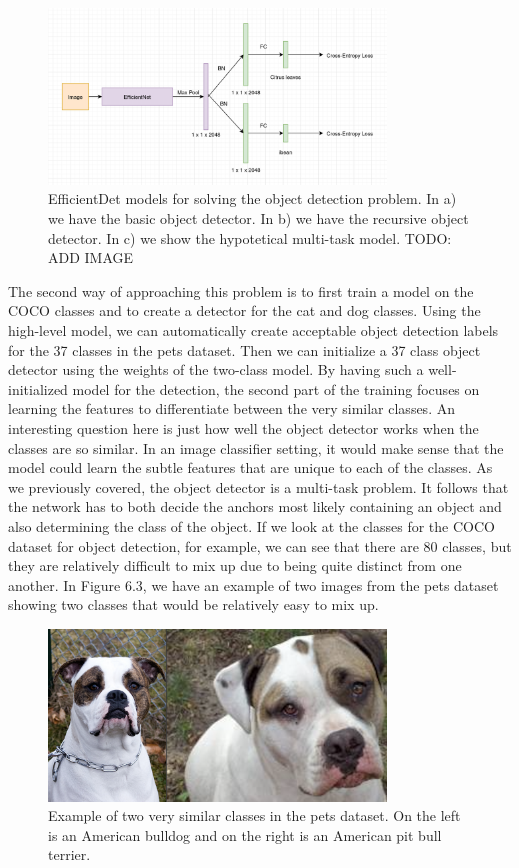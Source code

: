 \begin{figure}[h!] 
\centering 
\includegraphics[width=0.8\textwidth]{imgs/object_classification_architecture.png}
\caption{EfficientDet models for solving the object detection problem. In a) we have the basic object detector. In b) we have the recursive object detector. In c) we show the hypotetical multi-task model. TODO: ADD IMAGE}
\end{figure}

The second way of approaching this problem is to first train a model on the COCO classes and to create a detector for the cat and dog classes.
Using the high-level model, we can automatically create acceptable object detection labels for the 37 classes in the pets dataset.
Then we can initialize a 37 class object detector using the weights of the two-class model.
By having such a well-initialized model for the detection, the second part of the training focuses on learning the features to differentiate between the very similar classes.
An interesting question here is just how well the object detector works when the classes are so similar.
In an image classifier setting, it would make sense that the model could learn the subtle features that are unique to each of the classes.
As we previously covered, the object detector is a multi-task problem. 
It follows that the network has to both decide the anchors most likely containing an object and also determining the class of the object.
If we look at the classes for the COCO dataset for object detection, for example, we can see that there are 80 classes, but they are relatively difficult to mix up due to being quite distinct from one another. 
In Figure 6.3, we have an example of two images from the pets dataset showing two classes that would be relatively easy to mix up.

\begin{figure}[h!] 
\centering 
\includegraphics[width=0.8\textwidth]{imgs/pets-example.png}
\caption{Example of two very similar classes in the pets dataset. On the left is an American bulldog and on the right is an American pit bull terrier.}
\end{figure}

